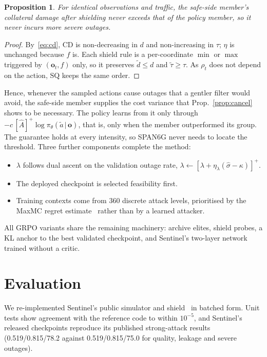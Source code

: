 \documentclass[journal]{IEEEtran}
\newtheorem{proposition}{Proposition}
\begin{document}
\begin{proposition}\label{prop:safe}
For identical observations and traffic, the safe-side member's collateral damage after shielding never exceeds that of the policy member, so it never incurs more severe outages.
\end{proposition}
\begin{proof}
By~\eqref{eq:cd}, $\mathrm{CD}$ is non-decreasing in $d$ and non-increasing in $\tau$; $\eta$ is unchanged because $f$ is. Each shield rule is a per-coordinate $\min$ or $\max$ triggered by $(\mathbf{o}_t,f)$ only, so it preserves $\tilde d\le d$ and $\tilde\tau\ge\tau$. As $\rho_t$ does not depend on the action, $\mathrm{SQ}$ keeps the same order.
\end{proof}

Hence, whenever the sampled actions cause outages that a gentler filter would avoid, the safe-side member supplies the cost variance that Prop.~\ref{prop:cancel} shows to be necessary. The policy learns from it only through $-c\,[\hat A]^+\log\pi_\theta(\tilde a\,|\,\mathbf{o})$, that is, only when the member outperformed its group. The guarantee holds at every intensity, so SPAN6G never needs to locate the threshold. Three further components complete the method:
\begin{itemize}
\item $\lambda$ follows dual ascent on the validation outage rate, $\lambda\leftarrow[\lambda+\eta_\lambda(\hat\sigma-\kappa)]^+$.
\item The deployed checkpoint is selected feasibility first.
\item Training contexts come from 360 discrete attack levels, prioritised by the MaxMC regret estimate~\cite{jiang2021robustplr,jiang2021plr} rather than by a learned attacker.
\end{itemize}
All GRPO variants share the remaining machinery: archive elites, shield probes, a KL anchor to the best validated checkpoint, and Sentinel's two-layer network trained without a critic.

\section{Evaluation}
\label{sec:eval}
We re-implemented Sentinel's public simulator and shield~\cite{sentinelcode} in batched form. Unit tests show agreement with the reference code to within $10^{-5}$, and Sentinel's released checkpoints reproduce its published strong-attack results (0.519/0.815/78.2 against 0.519/0.815/75.0 for quality, leakage and severe outages).
\end{document}
